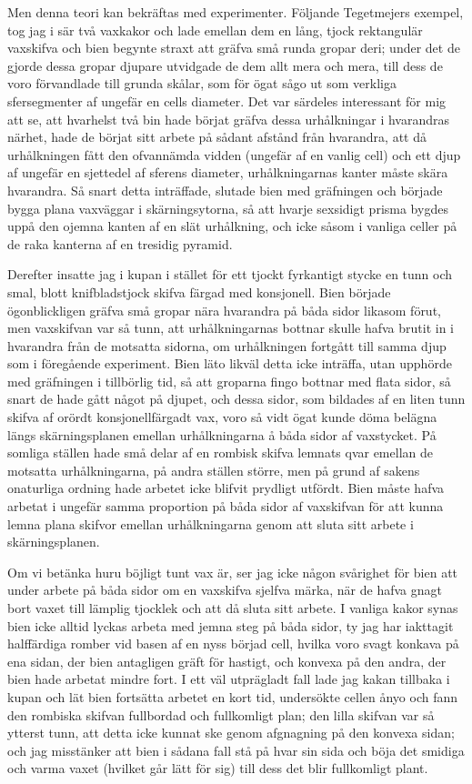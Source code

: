 Men denna teori kan bekräftas med experimenter. Följande Tegetmejers exempel, tog jag i sär två vaxkakor och lade emellan dem en lång, tjock rektangulär vaxskifva och bien begynte straxt att gräfva små runda gropar deri; under det de gjorde dessa gropar djupare utvidgade de dem allt mera och mera, till dess de voro förvandlade till grunda skålar, som för ögat sågo ut som verkliga sfersegmenter af ungefär en cells diameter. Det var särdeles interessant för mig att se, att hvarhelst två bin hade börjat gräfva dessa urhålkningar i hvarandras närhet, hade de börjat sitt arbete på sådant afstånd från hvarandra, att då urhålkningen fått den ofvannämda vidden (ungefär af en vanlig cell) och ett djup af ungefär en sjettedel af sferens diameter, urhålkningarnas kanter måste skära hvarandra. Så snart detta inträffade, slutade bien med gräfningen och började bygga plana vaxväggar i skärningsytorna, så att hvarje sexsidigt prisma bygdes uppå den ojemna kanten af en slät urhålkning, och icke såsom i vanliga celler på de raka kanterna af en tresidig pyramid.

Derefter insatte jag i kupan i stället för ett tjockt fyrkantigt stycke en tunn och smal, blott knifbladstjock skifva färgad med konsjonell. Bien började ögonblickligen gräfva små gropar nära hvarandra på båda sidor likasom förut, men vaxskifvan var så tunn, att urhålkningarnas bottnar skulle hafva brutit in i hvarandra från de motsatta sidorna, om urhålkningen fortgått till samma djup som i föregående experiment. Bien läto likväl detta icke inträffa, utan upphörde med gräfningen i tillbörlig tid, så att groparna fingo bottnar med flata sidor, så snart de hade gått något på djupet, och dessa sidor, som bildades af en liten tunn skifva af orördt konsjonellfärgadt vax, voro så vidt ögat kunde döma belägna längs skärningsplanen emellan urhålkningarna å båda sidor af vaxstycket. På somliga ställen hade små delar af en rombisk skifva lemnats qvar emellan de motsatta urhålkningarna, på andra ställen större, men på grund af sakens onaturliga ordning hade arbetet icke blifvit prydligt utfördt. Bien måste hafva arbetat i ungefär samma proportion på båda sidor af vaxskifvan för att kunna lemna plana skifvor emellan urhålkningarna genom att sluta sitt arbete i skärningsplanen.

Om vi betänka huru böjligt tunt vax är, ser jag icke någon svårighet för bien att under arbete på båda sidor om en vaxskifva sjelfva märka, när de hafva gnagt bort vaxet till lämplig tjocklek och att då sluta sitt arbete. I vanliga kakor synas bien icke alltid lyckas arbeta med jemna steg på båda sidor, ty jag har iakttagit halffärdiga romber vid basen af en nyss börjad cell, hvilka voro svagt konkava på ena sidan, der bien antagligen gräft för hastigt, och konvexa på den andra, der bien hade arbetat mindre fort. I ett väl utprägladt fall lade jag kakan tillbaka i kupan och lät bien fortsätta arbetet en kort tid, undersökte cellen ånyo och fann den rombiska skifvan fullbordad och fullkomligt plan; den lilla skifvan var så ytterst tunn, att detta icke kunnat ske genom afgnagning på den konvexa sidan; och jag misstänker att bien i sådana fall stå på hvar sin sida och böja det smidiga och varma vaxet (hvilket går lätt för sig) till dess det blir fullkomligt plant.

